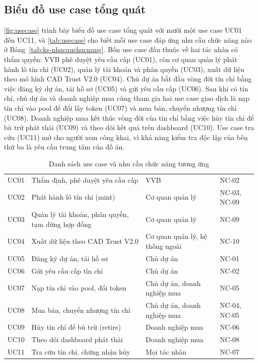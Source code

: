 \subsection*{Biểu đồ use case tổng quát}
\label{subsec:usecase}

\autoref{fig:usecase} trình bày biểu đồ use case tổng quát với mười một use case UC01 đến UC11, và \autoref{tab:usecase} cho biết mỗi use case đáp ứng nhu cầu chức năng nào ở Bảng~\ref{tab:ks-nhucauchucnang}. Bốn use case đầu thuộc về hai tác nhân có thẩm quyền: VVB phê duyệt yêu cầu cấp (UC01), còn cơ quan quản lý phát hành lô tín chỉ (UC02), quản lý tài khoản và phân quyền (UC03), xuất dữ liệu theo mô hình CAD Trust V2.0 (UC04). Chủ dự án bắt đầu vòng đời tín chỉ bằng việc đăng ký dự án, tải hồ sơ (UC05) và gửi yêu cầu cấp (UC06). Sau khi có tín chỉ, chủ dự án và doanh nghiệp mua cùng tham gia hai use case giao dịch là nạp tín chỉ vào pool để đổi lấy token (UC07) và mua bán, chuyển nhượng tín chỉ (UC08). Doanh nghiệp mua kết thúc vòng đời của tín chỉ bằng việc hủy tín chỉ để bù trừ phát thải (UC09) và theo dõi kết quả trên dashboard (UC10). Use case tra cứu (UC11) mở cho người xem công khai, vì khả năng kiểm tra độc lập của bên thứ ba là yêu cầu trung tâm của đồ án.

\HinhUseCase

\begin{table}[!htbp]
    \centering
    \caption{Danh sách use case và nhu cầu chức năng tương ứng}
    \label{tab:usecase}
    \small
    \begin{tabularx}{\textwidth}{|L{1.3cm}|Y|L{3.6cm}|L{2.2cm}|}
        \hline
         &  &  &  \\
        \hline
        UC01 & Thẩm định, phê duyệt yêu cầu cấp & VVB & NC-02 \\
        \hline
        UC02 & Phát hành lô tín chỉ (mint) & Cơ quan quản lý & NC-03, NC-09 \\
        \hline
        UC03 & Quản lý tài khoản, phân quyền, tạm dừng hợp đồng & Cơ quan quản lý & NC-09 \\
        \hline
        UC04 & Xuất dữ liệu theo CAD Trust V2.0 & Cơ quan quản lý, hệ thống ngoài & NC-10 \\
        \hline
        UC05 & Đăng ký dự án, tải hồ sơ & Chủ dự án & NC-01 \\
        \hline
        UC06 & Gửi yêu cầu cấp tín chỉ & Chủ dự án & NC-02 \\
        \hline
        UC07 & Nạp tín chỉ vào pool, đổi token & Chủ dự án, doanh nghiệp mua & NC-05 \\
        \hline
        UC08 & Mua bán, chuyển nhượng tín chỉ & Chủ dự án, doanh nghiệp mua & NC-04, NC-05 \\
        \hline
        UC09 & Hủy tín chỉ để bù trừ (retire) & Doanh nghiệp mua & NC-06 \\
        \hline
        UC10 & Theo dõi dashboard phát thải & Doanh nghiệp mua & NC-08 \\
        \hline
        UC11 & Tra cứu tín chỉ, chứng nhận hủy & Mọi tác nhân & NC-07 \\
        \hline
    \end{tabularx}
\end{table}

